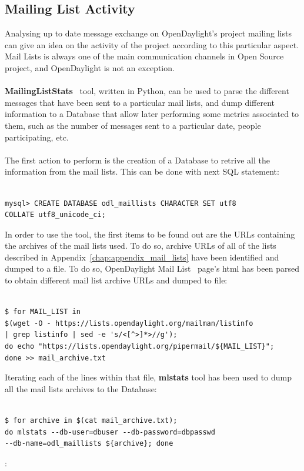 \documentclass[a4paper, 12pt]{book}
\begin{document}
\subsection{Mailing List Activity}
Analysing up to date message exchange on OpenDaylight's project mailing lists can give an idea on the activity of the project according to this particular aspect. Mail Lists is always one of the main communication channels in Open Source project, and OpenDaylight is not an exception.\\
\\
{\textbf{MailingListStats}}~\cite{MailStats} tool, written in Python, can be used to parse the different messages that have been sent to a particular mail lists, and dump different information to a Database that allow later performing some metrics associated to them, such as the number of messages sent to a particular date, people participating, etc.\\
\\
The first action to perform is the creation of a Database to retrive all the information from the mail lists. This can be done with next SQL statement:

\begin{verbatim}

mysql> CREATE DATABASE odl_maillists CHARACTER SET utf8
COLLATE utf8_unicode_ci;

\end{verbatim}

In order to use the tool, the first items to be found out are the URLs containing the archives of the mail lists used. To do so, archive URLs of all of the lists described in Appendix~\ref{chap:appendix_mail_lists} have been identified and dumped to a file. To do so, OpenDaylight Mail List~\cite{OpenDaylightMailLists} page's html has been parsed to obtain different mail list archive URLs and dumped to file:

\begin{verbatim}

$ for MAIL_LIST in
$(wget -O - https://lists.opendaylight.org/mailman/listinfo
| grep listinfo | sed -e 's/<[^>]*>//g');
do echo "https://lists.opendaylight.org/pipermail/${MAIL_LIST}";
done >> mail_archive.txt

\end{verbatim}

Iterating each of the lines within that file, \textbf{mlstats} tool has been used to dump all the mail lists archives to the Database:

\begin{verbatim}

$ for archive in $(cat mail_archive.txt);
do mlstats --db-user=dbuser --db-password=dbpasswd
--db-name=odl_maillists ${archive}; done

\end{verbatim}
:
\end{document}
